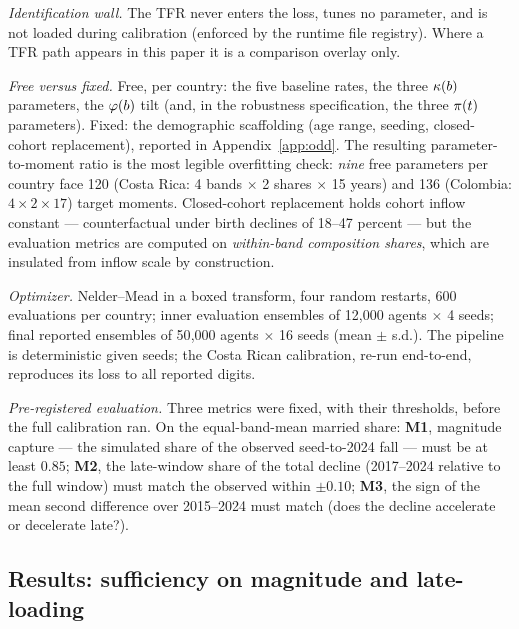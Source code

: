 \emph{Identification wall.} The TFR never enters the loss, tunes no parameter,
and is not loaded during calibration (enforced by the runtime file registry).
Where a TFR path appears in this paper it is a comparison overlay only.

\emph{Free versus fixed.} Free, per country: the five baseline rates, the three
$\kappa(b)$ parameters, the $\varphi(b)$ tilt (and, in the robustness specification, the
three $\pi(t)$ parameters). Fixed: the demographic scaffolding (age range,
seeding, closed-cohort replacement), reported in Appendix~\ref{app:odd}. The
resulting parameter-to-moment ratio is the most legible overfitting check:
\emph{nine} free parameters per country face 120 (Costa Rica: 4 bands
$\times$ 2 shares $\times$ 15 years) and 136 (Colombia: $4 \times 2 \times 17$)
target moments. Closed-cohort replacement holds cohort inflow constant ---
counterfactual under birth declines of 18--47 percent --- but the evaluation
metrics are computed on \emph{within-band composition shares}, which are
insulated from inflow scale by construction.

\emph{Optimizer.} Nelder--Mead in a boxed transform, four random restarts, 600
evaluations per country; inner evaluation ensembles of 12{,}000 agents
$\times$ 4 seeds; final reported ensembles of 50{,}000 agents $\times$ 16 seeds
(mean $\pm$ s.d.). The pipeline is deterministic given seeds; the Costa Rican
calibration, re-run end-to-end, reproduces its loss to all reported digits.

\emph{Pre-registered evaluation.} Three metrics were fixed, with their
thresholds, before the full calibration ran. On the equal-band-mean married
share: \textbf{M1}, magnitude capture --- the simulated share of the observed
seed-to-2024 fall --- must be at least $0.85$; \textbf{M2}, the late-window
share of the total decline (2017--2024 relative to the full window) must match
the observed within $\pm 0.10$; \textbf{M3}, the sign of the mean second
difference over 2015--2024 must match (does the decline accelerate or
decelerate late?).

\subsection{Results: sufficiency on magnitude and late-loading}
\label{sec:results}


